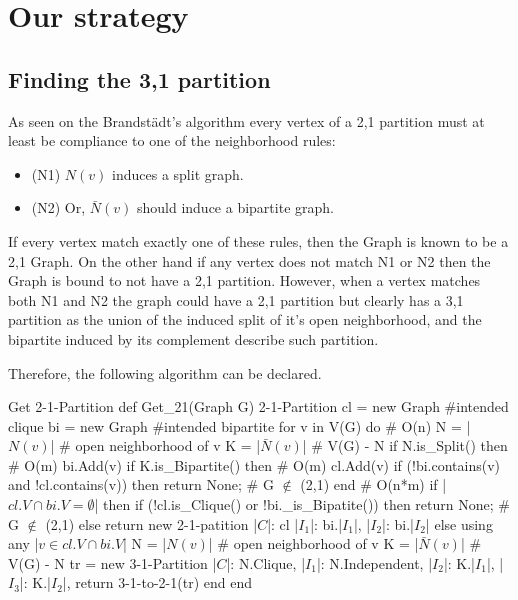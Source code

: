 \chapter{Our strategy}\label{ch:os}


\section{Finding the 3,1 partition}\label{sec:3,1-partition}

As seen on the Brandstädt's algorithm every vertex of a 2,1 partition must at least be compliance to one of the neighborhood rules:

\begin{itemize}
    \item (N1) $N(v)$ induces a split graph.
    \item (N2) Or, $\bar{N}(v)$ should induce a bipartite graph.
\end{itemize}

If every vertex match exactly one of these rules, then the Graph is known to be a 2,1 Graph.
On the other hand if any vertex does not match N1 or N2 then the Graph is bound to not have a 2,1 partition.
However, when a vertex matches both N1 and N2 the graph could have a 2,1 partition but clearly has a 3,1 partition as the union of the induced split of it's open neighborhood, and the bipartite induced by its complement describe such partition.

Therefore, the following algorithm can be declared.
\begin{code}{Get 2-1-Partition}
def Get_21(Graph G) 2-1-Partition
  cl = new Graph #intended clique
  bi = new Graph #intended bipartite
  for v in V(G) do # O(n)
      N = |$N(v)$| # open neighborhood of v
      K = |$\bar{N}(v)$| # V(G) - N
      if N.is_Split() then # O(m)
        bi.Add(v)
      if K.is_Bipartite() then # O(m)
        cl.Add(v)
      if (!bi.contains(v) and !cl.contains(v)) then
       return None; # G $\notin$ (2,1)
  end # O(n*m)
  if |$cl.V \cap bi.V = \emptyset$| then
    if (!cl.is_Clique() or !bi._is_Bipatite()) then
      return None; # G $\notin$ (2,1)
    else return new 2-1-patition{
      |$C$|: cl
      |$I_1$|: bi.|$I_1$|,
      |$I_2$|: bi.|$I_2$|
    }
  else
    using any |$v \in cl.V \cap bi.V$|
    N = |$N(v)$| # open neighborhood of v
    K = |$\bar{N}(v)$| # V(G) - N
    tr = new 3-1-Partition{
          |$C$|: N.Clique,
          |$I_1$|: N.Independent,
          |$I_2$|: K.|$I_1$|,
          |$I_3$|: K.|$I_2$|,
    }
    return 3-1-to-2-1(tr)
  end
end
\end{code}



